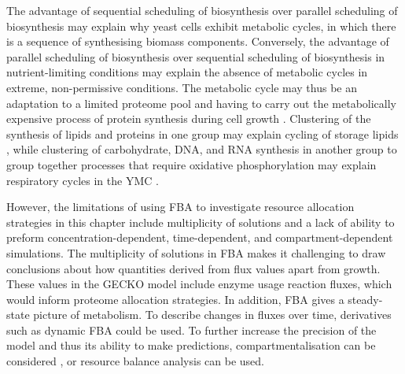 The advantage of sequential scheduling of biosynthesis over parallel scheduling of biosynthesis may explain why yeast cells exhibit metabolic cycles, in which there is a sequence of synthesising biomass components.
Conversely, the advantage of parallel scheduling of biosynthesis over sequential scheduling of biosynthesis in nutrient-limiting conditions may explain the absence of metabolic cycles in extreme, non-permissive conditions.
The metabolic cycle may thus be an adaptation to a limited proteome pool and having to carry out the metabolically expensive process of protein synthesis during cell growth \parencite{oneillEukaryoticCellBiology2020}.
Clustering of the synthesis of lipids and proteins in one group may explain cycling of storage lipids \parencite{campbellBuildingBlocksAre2020}, while clustering of carbohydrate, DNA, and RNA synthesis in another group to group together processes that require oxidative phosphorylation may explain respiratory cycles in the YMC \parencite{tuLogicYeastMetabolic2005}.

However, the limitations of using FBA to investigate resource allocation strategies in this chapter include multiplicity of solutions and a lack of ability to preform concentration-dependent, time-dependent, and compartment-dependent simulations.
The multiplicity of solutions in FBA makes it challenging to draw conclusions about how quantities derived from flux values apart from growth.
These values in the GECKO model include enzyme usage reaction fluxes, which would inform proteome allocation strategies.
In addition, FBA gives a steady-state picture of metabolism.
To describe changes in fluxes over time, derivatives such as dynamic FBA \parencite{mahadevanDynamicFluxBalance2002} could be used.
To further increase the precision of the model and thus its ability to make predictions, compartmentalisation can be considered \parencite{elsemmanWholecellModelingYeast2022}, or resource balance analysis \parencite{goelzerCellDesignBacteria2011} can be used.
